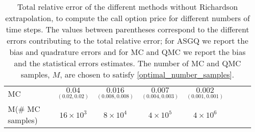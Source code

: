 \begin{table}[h!]
\begin{small}
\begin{tabular}{l*{6}{c}r}
			\hline
			MC    & $\underset{(0.02,0.02)}{\mathbf{0.04}}$  &  $\underset{(0.008,0.008)}{\mathbf{0.016}}$  & $\underset{(0.004,0.003)}{\mathbf{0.007}}$ & $\underset{(0.001,0.001)}{\mathbf{0.002}}$  \\	
			M(\# MC samples) 	& $16 \times 10^3$  &  $8 \times 10^4$  & $ 4 \times 10^5$ & $4 \times 10^6$  \\
			\bottomrule[1.25pt]
		\end{tabular}
		\caption{Total relative error of the different methods without Richardson extrapolation, to compute the call option price for different numbers of time steps. The values between parentheses correspond to the different errors contributing to the total relative error; for ASGQ we report the bias and quadrature errors and for MC and QMC we report the bias and the statistical errors estimates. The number of MC and QMC  samples, $M$, are chosen to satisfy \eqref{optimal_number_samples}.}
		\label{Total error of MISC and MC to compute Call option price of the different tolerances for different number of time steps. Case set 3, without Richardson extrapolation. The numbers between parentheses are the corresponding absolute errors.}
	\end{small}
\end{table}


